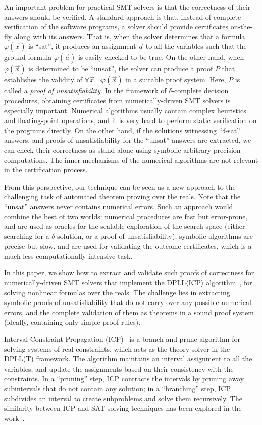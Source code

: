 \documentclass[envcountsect]{llncs}
\begin{document}
An important problem
for practical SMT solvers is that the correctness
of their answers should be verified. A standard approach is that, instead of
complete verification of the software programs, a solver should provide
certificates on-the-fly along with its answers. That is, when the solver
determines that a formula $\varphi(\vec x)$ is ``sat'', it produces an
assignment $\vec a$ to all the
variables such that the ground formula $\varphi(\vec a)$ is easily checked to be
true. On the other hand, when $\varphi(\vec x)$ is determined to be ``unsat'',
the solver can produce a proof $P$ that establishes the validity of $\forall
\vec x.\neg\varphi(\vec x)$ in a suitable proof system. Here, $P$ is called a
{\em proof of unsatisfiability}. In the framework of $\delta$-complete
decision procedures, obtaining certificates from numerically-driven SMT solvers
is especially important. Numerical algorithms usually contain complex heuristics
and floating-point operations, and it is very hard to perform static
verification on the programs directly. On the other hand, if the solutions
witnessing ``$\delta$-sat'' answers, and proofs of unsatisfiability for the
``unsat'' answers are extracted,
we can check their correctness as stand-alone using symbolic
arbitrary-precision computations. The inner mechanisms of the numerical
algorithms are not relevant in the certification process.

From this perspective, our technique can be seen as a new approach to the challenging
task of automated theorem proving over the reals. Note that the ``unsat''
answers never contains numerical errors. Such an approach
 would combine the best of two worlds: numerical procedures are
fast but error-prone, and are used as oracles for the scalable exploration of
the search space (either searching for a $\delta$-solution, or a proof of
unsatisfiability); symbolic algorithms are precise but slow, and are used for
validating the outcome certificates, which is a much less
computationally-intensive task.

In this paper, we show how to extract and validate such proofs
of correctness for numerically-driven SMT solvers that implement the
DPLL$\langle$ICP$\rangle$ algorithm~\cite{DBLP:conf/cade/GaoAC12}, for solving nonlinear formulas over
the reals. The challenge lies in extracting symbolic proofs of unsatisfiability
that do not carry over any possible numerical errors, and the complete
validation of them as theorems in a sound proof system (ideally, containing only
simple proof rules).

Interval Constraint Propagation (ICP)~\cite{Newton} is a branch-and-prune algorithm
for solving systems of real constraints, which acts as the theory solver in the
DPLL(T) framework. The algorithm maintains an interval
assignment to all the variables, and update the assignments based on their
consistency with the constraints. In a ``pruning''
step, ICP contracts the intervals by pruning away subintervals that do not
contain any solution; in a ``branching'' step, ICP subdivides an interval to
create subproblems and solve them recursively. The similarity between ICP and SAT solving techniques has
been explored in the work~\cite{}.
\end{document}
